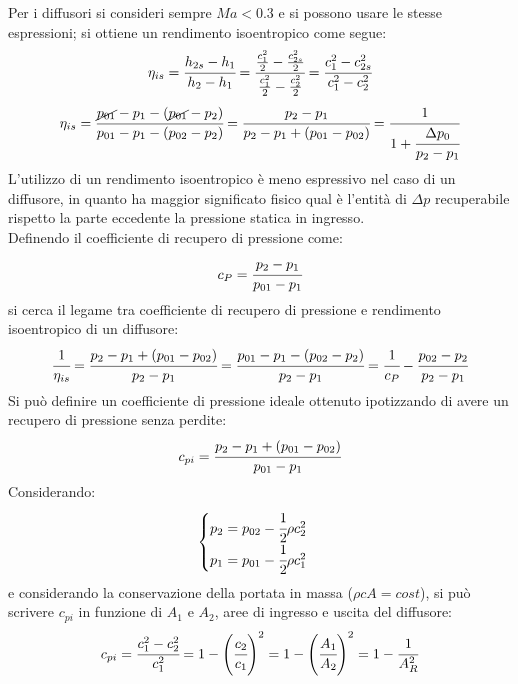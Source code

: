 Per i diffusori si consideri sempre $Ma<0.3$ e si possono usare le stesse espressioni; si ottiene un rendimento isoentropico come segue:
\begin{align*}
\eta_{is} = \cfrac{h_{2s}-h_1}{h_2-h_1} =\cfrac{\frac{c_1^2}{2}-\frac{c_{2s}^2}{2}}{\frac{c_1^2}{2}-\frac{c_2^2}{2}}= \cfrac{c_1^2 - c_{2s}^2}{c_1^2 - c_2^2}
\end{align*}
\begin{align*}
\eta_{is} = \cfrac{\cancel{p_{01}} - p_1 - (\cancel{p_{01}} - p_2)}{p_{01} - p_1-(p_{02} - p_2)} = \cfrac{p_2 - p_1}{p_2 - p_1 + (p_{01} - p_{02})} = \cfrac{1}{1+ \cfrac{\Delta p_0}{p_2 - p_1}}
\end{align*}
L'utilizzo di un rendimento isoentropico è meno espressivo nel caso di un diffusore, in quanto ha maggior significato fisico qual è l'entità di $ \Delta p$ recuperabile rispetto la parte eccedente la pressione statica in ingresso.\\
Definendo il coefficiente di recupero di pressione come:
\begin{align*}
c_P = \cfrac{p_2 - p_1}{p_{01} - p_1}
\end{align*}
si cerca il legame tra coefficiente di recupero di pressione e rendimento isoentropico di un diffusore:
\begin{align*}
\cfrac{1}{\eta_{is}} = \cfrac{p_2 - p_1 + (p_{01} - p_{02})}{p_2 - p_1} = \cfrac{p_{01} - p_1 - (p_{02} - p_2)}{p_2-p_1} = \cfrac{1}{c_P} - \cfrac{p_{02} - p_2}{p_2 - p_1}
\end{align*}
Si può definire un coefficiente di pressione ideale ottenuto ipotizzando di avere un recupero di pressione senza perdite:
\begin{align*}
c_{pi} = \cfrac{p_2 - p_1 + (p_{01} - p_{02})}{p_{01} - p_1}
\end{align*}
Considerando:
\begin{align*}
\begin{cases}
p_{2} = p_{02} - \cfrac{1}{2} \rho c_2^2\\
p_{1} = p_{01} - \cfrac{1}{2} \rho c_1^2
\end{cases}
\end{align*}
e considerando la conservazione della portata in massa ($\rho c A=cost$), si può scrivere $c_{pi}$ in funzione di $A_1$ e $A_2$, aree di ingresso e uscita del diffusore:
\begin{align*}
c_{pi} = \cfrac{c_1^2 - c_2^2}{c_1^2} = 1 - \left( \cfrac{c_2}{c_1}\right)^2 = 1- \left(\cfrac{A_1}{A_2} \right)^2 =1-\cfrac{1}{A_R^2}
\end{align*}
